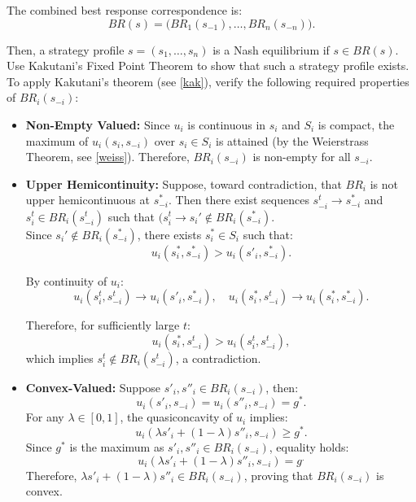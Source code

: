 \documentclass{article}
\begin{document}
The combined best response correspondence is:
\[
    BR(s) = \big(BR_1(s_{-1}), \ldots, BR_n(s_{-n})\big).
\]

Then, a strategy profile \(s = (s_1, \ldots, s_n)\) is a Nash equilibrium if \(s \in BR(s)\). Use Kakutani’s Fixed Point Theorem to show that such a strategy profile exists. To apply Kakutani’s theorem (see \ref{kak}), verify the following required properties of \(BR_i(s_{-i})\):
\begin{itemize}
    \item \textbf{Non-Empty Valued:} Since \(u_i\) is continuous in \(s_i\) and \(S_i\) is compact, the maximum of \(u_i(s_i, s_{-i})\) over \(s_i \in S_i\) is attained (by the Weierstrass Theorem, see \ref{weiss}). Therefore, \(BR_i(s_{-i})\) is non-empty for all \(s_{-i}\).
    
    \item \textbf{Upper Hemicontinuity:} Suppose, toward contradiction, that \(BR_{i}\) is not upper hemicontinuous at \(s^{*}_{-i}\). Then there exist sequences \(s^t_{-i} \to s^*_{-i}\) and \(s^t_{i} \in BR_i(s^{t}_{-i})\) such that $(s^{t}_{i} \to s_{i}' \notin BR_{i}(s_{-i}^{*})$. \\ 

    Since \(s_{i}' \notin BR_{i}(s^{*}_{-i})\), there exists \(s^{*}_{i} \in S_{i}\) such that:
    \[
        u_i(s^*_{i}, s^*_{-i}) > u_i(s'_{i}, s^*_{-i}).
    \]

    By continuity of \(u_i\):
    \[
        u_i(s^t_{i}, s^t_{-i}) \to u_i(s'_i, s^*_{-i}), \quad u_i(s^*_{i}, s^t_{-i}) \to u_i(s^*_{i}, s^*_{-i}).
    \]

    Therefore, for sufficiently large \(t\):
    \[
        u_i(s^*_{i}, s^t_{-i}) > u_i(s^t_{i}, s^t_{-i}),
    \]
    which implies \(s^t_i \notin BR_i(s^t_{-i})\), a contradiction.
    
    \item \textbf{Convex-Valued:} Suppose \(s'_i, s''_i \in BR_i(s_{-i})\), then:
    \[
        u_i(s'_{i}, s_{-i}) = u_i(s''_{i}, s_{-i}) = g^*.
    \]
    For any \(\lambda \in [0, 1]\), the quasiconcavity of \(u_i\) implies:
    \[
        u_i(\lambda s'_i + (1 - \lambda)s''_i, s_{-i}) \geq g^*.
    \]
    Since \(g^*\) is the maximum as \(s'_i, s''_i \in BR_i(s_{-i})\), equality holds:
    \[
        u_i(\lambda s'_i + (1 - \lambda)s''_i, s_{-i}) = g^.
    \]
    Therefore, \(\lambda s'_i + (1 - \lambda)s''_i \in BR_i(s_{-i})\), proving that \(BR_i(s_{-i})\) is convex.
\end{itemize}
\end{document}

